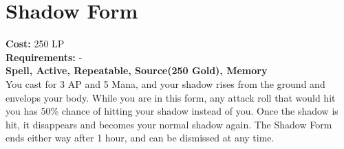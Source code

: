 \section{Shadow Form}\label{spell:shadowForm}
\textbf{Cost:} 250 LP\\
\textbf{Requirements:} -\\
\textbf{Spell, Active, Repeatable, Source(250 Gold), Memory}\\
You cast for 3 AP and 5 Mana, and your shadow rises from the ground and envelops your body.
While you are in this form, any attack roll that would hit you has 50\% chance of hitting your shadow instead of you.
Once the shadow is hit, it disappears and becomes your normal shadow again.
The Shadow Form ends either way after 1 hour, and can be dismissed at any time.